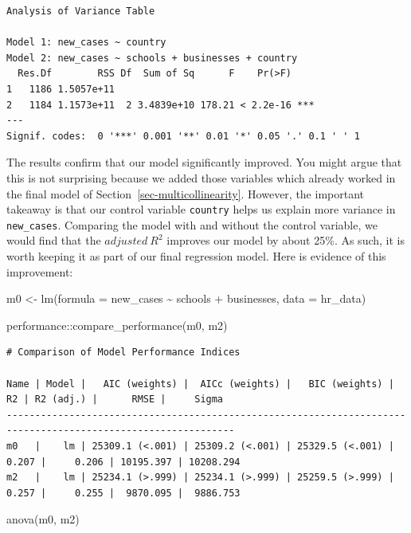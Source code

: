 \documentclass[
  letterpaper,
]{krantz}
\makeatletter
\newenvironment{Shaded}{\begin{snugshade}}{\end{snugshade}}
\newcommand{\AttributeTok}[1]{\textcolor[rgb]{0.40,0.45,0.13}{#1}}
\newcommand{\FunctionTok}[1]{\textcolor[rgb]{0.28,0.35,0.67}{#1}}
\newcommand{\NormalTok}[1]{\textcolor[rgb]{0.00,0.23,0.31}{#1}}
\newcommand{\OtherTok}[1]{\textcolor[rgb]{0.00,0.23,0.31}{#1}}
\newcommand{\SpecialCharTok}[1]{\textcolor[rgb]{0.37,0.37,0.37}{#1}}
\newenvironment{kframe}{%
\medskip{}
\setlength{\fboxsep}{.8em}
 \def\at@end@of@kframe{}%
 \ifinner\ifhmode%
  \def\at@end@of@kframe{\end{minipage}}%
  \begin{minipage}{\columnwidth}%
 \fi\fi%
 \def\FrameCommand##1{\hskip\@totalleftmargin \hskip-\fboxsep
 \colorbox{shadecolor}{##1}\hskip-\fboxsep
     \hskip-\linewidth \hskip-\@totalleftmargin \hskip\columnwidth}%
 \MakeFramed {\advance\hsize-\width
   \@totalleftmargin\z@ \linewidth\hsize
   \@setminipage}}%
 {\par\unskip\endMakeFramed%
 \at@end@of@kframe}
\renewenvironment{Shaded}{\begin{kframe}}{\end{kframe}}
\makeatother
\begin{document}
\begin{verbatim}
Analysis of Variance Table

Model 1: new_cases ~ country
Model 2: new_cases ~ schools + businesses + country
  Res.Df        RSS Df  Sum of Sq      F    Pr(>F)    
1   1186 1.5057e+11                                   
2   1184 1.1573e+11  2 3.4839e+10 178.21 < 2.2e-16 ***
---
Signif. codes:  0 '***' 0.001 '**' 0.01 '*' 0.05 '.' 0.1 ' ' 1
\end{verbatim}

The results confirm that our model significantly improved. You might
argue that this is not surprising because we added those variables which
already worked in the final model of
Section~\ref{sec-multicollinearity}. However, the important takeaway is
that our control variable \texttt{country} helps us explain more
variance in \texttt{new\_cases}. Comparing the model with and without
the control variable, we would find that the \(adjusted\ R^2\) improves
our model by about 25\%. As such, it is worth keeping it as part of our
final regression model. Here is evidence of this improvement:

\begin{Shaded}
\begin{Highlighting}[]
\NormalTok{m0 }\OtherTok{\textless{}{-}} \FunctionTok{lm}\NormalTok{(}\AttributeTok{formula =}\NormalTok{ new\_cases }\SpecialCharTok{\textasciitilde{}}
\NormalTok{           schools }\SpecialCharTok{+}
\NormalTok{           businesses,}
         \AttributeTok{data =}\NormalTok{ hr\_data)}

\NormalTok{performance}\SpecialCharTok{::}\FunctionTok{compare\_performance}\NormalTok{(m0, m2)}
\end{Highlighting}
\end{Shaded}

\begin{verbatim}
# Comparison of Model Performance Indices

Name | Model |   AIC (weights) |  AICc (weights) |   BIC (weights) |    R2 | R2 (adj.) |      RMSE |     Sigma
--------------------------------------------------------------------------------------------------------------
m0   |    lm | 25309.1 (<.001) | 25309.2 (<.001) | 25329.5 (<.001) | 0.207 |     0.206 | 10195.397 | 10208.294
m2   |    lm | 25234.1 (>.999) | 25234.1 (>.999) | 25259.5 (>.999) | 0.257 |     0.255 |  9870.095 |  9886.753
\end{verbatim}

\begin{Shaded}
\begin{Highlighting}[]
\FunctionTok{anova}\NormalTok{(m0, m2)}
\end{Highlighting}
\end{Shaded}
\end{document}
